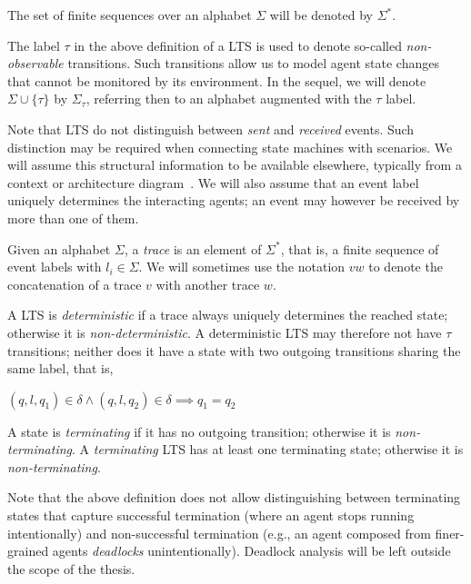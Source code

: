 The set of finite sequences over an alphabet $\Sigma$ will be denoted by $\Sigma^{*}$.

The label $\tau$ in the above definition of a LTS is used to denote so-called \emph{non-observable} transitions. Such transitions allow us to model agent state changes that cannot be monitored by its environment. In the sequel, we will denote $\Sigma\cup\{\tau\}$ by $\Sigma_{\tau}$, referring then to an alphabet augmented with the $\tau$ label.

Note that LTS do not distinguish between \emph{sent} and \emph{received} events. Such distinction may be required when connecting state machines with scenarios. We will assume this structural information to be available elsewhere, typically from a context or architecture diagram~\cite{Ward:1985, Magee:1995}. We will also assume that an event label uniquely determines the interacting agents; an event may however be received by more than one of them. 

\begin{definition}[Trace]
Given an alphabet $\Sigma$, a \emph{trace} is an element of $\Sigma^{*}$, that is, a finite sequence of event labels  with $l_i \in \Sigma$. We will sometimes use the notation $vw$ to denote the concatenation of a trace $v$ with another trace $w$.
\end{definition}

\begin{definition}
A LTS is \emph{deterministic} if a trace always uniquely determines the reached state; otherwise it is \emph{non-deterministic}. A deterministic LTS may therefore not have $\tau$ transitions; neither does it have a state with two outgoing transitions sharing the same label, that is, 
\begin{center}$(q,l,q_1) \in \delta \wedge (q,l,q_2) \in \delta \implies q_1 = q_2$\end{center}
\end{definition}

\begin{definition}
A state is \emph{terminating} if it has no outgoing transition; otherwise it is \emph{non-terminating}. A \emph{terminating} LTS has at least one terminating state; otherwise it is \emph{non-terminating}.\label{definition:terminating-lts}
\end{definition}

Note that the above definition does not allow distinguishing between terminating states that capture successful termination (where an agent stops running intentionally) and non-successful termination (e.g., an agent composed from finer-grained agents \emph{deadlocks} unintentionally). Deadlock analysis will be left outside the scope of the thesis.

